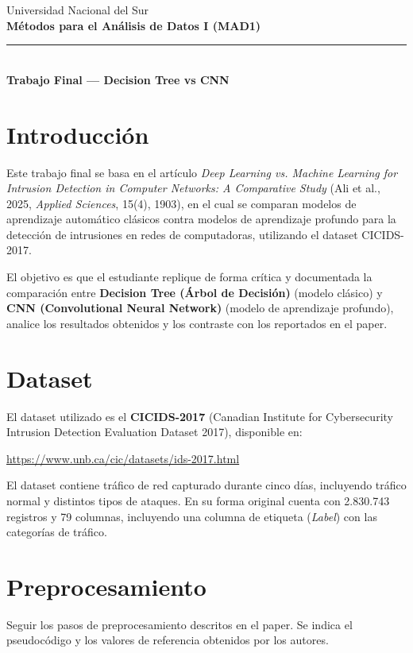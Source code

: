 \documentclass[11pt,a4paper]{article}
\begin{document}
\begin{center}
    {\color{azulUNS}\small Universidad Nacional del Sur}\\[2pt]
    {\color{azulUNS}\Large\bfseries M\'etodos para el An\'alisis de Datos I (MAD1)}\\[6pt]
    {\color{azulUNS}\rule{\textwidth}{1.2pt}}\\[8pt]
    {\Large\bfseries Trabajo Final --- Decision Tree vs CNN}
\end{center}

\vspace{1em}

\section{Introducci\'on}
Este trabajo final se basa en el art\'iculo \textit{Deep Learning vs. Machine Learning for Intrusion Detection in Computer Networks: A Comparative Study} (Ali et al., 2025, \textit{Applied Sciences}, 15(4), 1903), en el cual se comparan modelos de aprendizaje autom\'atico cl\'asicos contra modelos de aprendizaje profundo para la detecci\'on de intrusiones en redes de computadoras, utilizando el dataset CICIDS-2017.

El objetivo es que el estudiante replique de forma cr\'itica y documentada la comparaci\'on entre \textbf{Decision Tree (Árbol de Decisión)} (modelo cl\'asico) y \textbf{CNN (Convolutional Neural Network)} (modelo de aprendizaje profundo), analice los resultados obtenidos y los contraste con los reportados en el paper.

\section{Dataset}
El dataset utilizado es el \textbf{CICIDS-2017} (Canadian Institute for Cybersecurity Intrusion Detection Evaluation Dataset 2017), disponible en:
\begin{center}
\url{https://www.unb.ca/cic/datasets/ids-2017.html}
\end{center}
El dataset contiene tr\'afico de red capturado durante cinco d\'ias, incluyendo tr\'afico normal y distintos tipos de ataques. En su forma original cuenta con 2.830.743 registros y 79 columnas, incluyendo una columna de etiqueta (\textit{Label}) con las categor\'ias de tr\'afico.

\section{Preprocesamiento}
Seguir los pasos de preprocesamiento descritos en el paper. Se indica el pseudoc\'odigo y los valores de referencia obtenidos por los autores.
\end{document}
